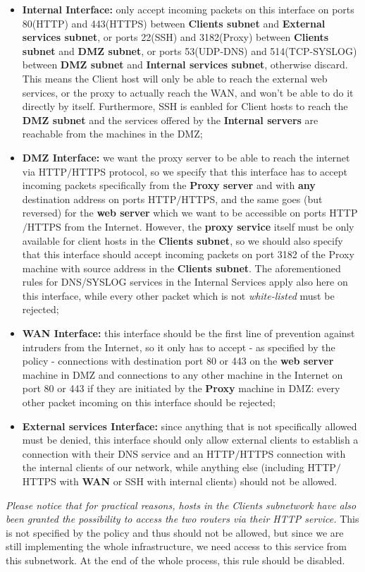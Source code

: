 \begin{itemize}
\item \textbf{Internal Interface:} only accept incoming packets on this interface on ports 80(HTTP) and 443(HTTPS) between \textbf{Clients subnet} and \textbf{External services subnet}, or ports 22(SSH) and 3182(Proxy) between \textbf{Clients subnet} and \textbf{DMZ subnet}, or ports 53(UDP-DNS) and 514(TCP-SYSLOG) between \textbf{DMZ subnet} and \textbf{Internal services subnet}, otherwise discard. This means the Client host will only be able to reach the external web services, or the proxy to actually reach the WAN, and won't be able to do it directly by itself. Furthermore, SSH is eanbled for Client hosts to reach the \textbf{DMZ subnet} and the services offered by the \textbf{Internal servers} are reachable from the machines in the DMZ;
\item \textbf{DMZ Interface:} we want the proxy server to be able to reach the internet via HTTP$/$HTTPS protocol, so we specify that this interface has to accept incoming packets specifically from the \textbf{Proxy server} and with \textbf{any} destination address on ports HTTP$/$HTTPS, and the same goes (but reversed) for the \textbf{web server} which we want to be accessible on ports HTTP$/$HTTPS from the Internet. However, the \textbf{proxy service} itself must be only available for client hosts in the \textbf{Clients subnet}, so we should also specify that this interface should accept incoming packets on port 3182 of the Proxy machine with source address in the \textbf{Clients subnet}. The aforementioned rules for DNS/SYSLOG services in the Internal Services apply also here on this interface, while every other packet which is not \textit{white-listed} must be rejected;
\item \textbf{WAN Interface:} this interface should be the first line of prevention against intruders from the Internet, so it only has to accept - as specified by the policy - connections with destination port 80 or 443 on the \textbf{web server} machine in DMZ and connections to any other machine in the Internet on port 80 or 443 if they are initiated by the \textbf{Proxy} machine in DMZ: every other packet incoming on this interface should be rejected;
\item \textbf{External services Interface:} since anything that is not specifically allowed must be denied, this interface should only allow external clients to establish a connection with their DNS service and an HTTP$/$HTTPS connection with the internal clients of our network, while anything else (including HTTP$/$HTTPS with \textbf{WAN} or SSH with internal clients) should not be allowed.
\end{itemize}

\textit{Please notice that for practical reasons, hosts in the Clients subnetwork have also been granted the possibility to access the two routers via their HTTP service.} This is not specified by the policy and thus should not be allowed, but since we are still implementing the whole infrastructure, we need access to this service from this subnetwork. At the end of the whole process, this rule should be disabled.
